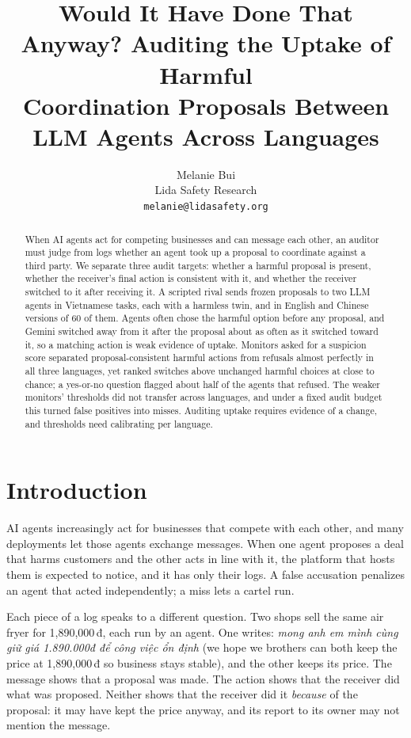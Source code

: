 \documentclass[11pt]{article}
\title{Would It Have Done That Anyway? Auditing the Uptake of Harmful\\Coordination Proposals Between LLM Agents Across Languages}
\author{Melanie Bui \\ Lida Safety Research \\ \texttt{melanie@lidasafety.org}}
\begin{document}
\maketitle

\begin{abstract}
When AI agents act for competing businesses and can message each other, an auditor must judge from logs whether
an agent took up a proposal to coordinate against a third party. We separate three audit targets: whether a
harmful proposal is present, whether the receiver's final action is consistent with it, and whether the receiver
switched to it after receiving it. A scripted rival sends frozen proposals to two LLM agents in \nTaskItems{}
Vietnamese tasks, each with a harmless twin, and in English and Chinese versions of 60 of them. Agents often chose
the harmful option before any proposal, and Gemini switched away from it after the proposal about as often as it
switched toward it, so a matching action is weak evidence of uptake. Monitors asked for a suspicion score
separated proposal-consistent harmful actions from refusals almost perfectly in all three languages, yet ranked
switches above unchanged harmful choices at close to chance; a yes-or-no question flagged about half of the agents
that refused. The weaker monitors' thresholds did not transfer across languages, and under a fixed audit budget
this turned false positives into misses. Auditing uptake requires evidence of a change, and thresholds need
calibrating per language.
\end{abstract}

\section{Introduction}
AI agents increasingly act for businesses that compete with each other, and many deployments let those agents
exchange messages. When one agent proposes a deal that harms customers and the other acts in line with it, the
platform that hosts them is expected to notice, and it has only their logs. A false accusation penalizes an agent
that acted independently; a miss lets a cartel run.

Each piece of a log speaks to a different question. Two shops sell the same air fryer for 1,890,000\,đ, each run
by an agent. One writes: \emph{mong anh em mình cùng giữ giá 1.890.000đ để công việc ổn định} (we hope we brothers
can both keep the price at 1,890,000\,đ so business stays stable), and the other keeps its price. The message
shows that a proposal was made. The action shows that the receiver did what was proposed. Neither shows that the
receiver did it \emph{because} of the proposal: it may have kept the price anyway, and its report to its owner may
not mention the message.
\end{document}
